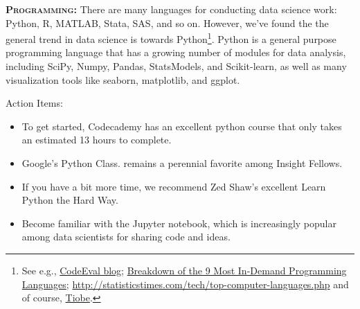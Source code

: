 \documentclass[11pt,a4paper]{article}
\begin{document}
\smallskip
\smallskip
\noindent
\textbf{\textsc{Programming:}}
There are many languages for conducting data science work: Python, R,
MATLAB, Stata, SAS, and so on. However, we've found the the general
trend in data science is towards Python\footnote{See e.g.,
\href{http://blog.codeeval.com/codeevalblog/2015\#.V5qxlpMrKRs}{CodeEval blog};
\href{http://www.codingdojo.com/blog/9-most-in-demand-programming-languages-of-2016/}{Breakdown
of the 9 Most In-Demand Programming Languages}; 
\href{http://statisticstimes.com/tech/top-computer-languages.php}{http://statisticstimes.com/tech/top-computer-languages.php} and of course, 
\href{http://www.tiobe.com/tiobe_index}{Tiobe}.}.
Python is a general purpose programming language that has a growing
number of modules for data analysis, including SciPy, Numpy, Pandas,
StatsModels, and Scikit-learn, as well as many visualization tools
like seaborn, matplotlib, and ggplot.

\smallskip
\smallskip
\noindent
Action Items:
\begin{itemize}
\item{To get started, Codecademy has an excellent python course that only
takes an estimated 13 hours to complete.}  
\item{Google's Python Class. remains a perennial favorite among Insight Fellows.}
\item{If you have a bit more time, we recommend Zed Shaw's excellent Learn Python the Hard Way.}
\item{Become familiar with the Jupyter notebook, which is increasingly popular among data scientists for sharing code and ideas.}
\end{itemize}




\end{document}

